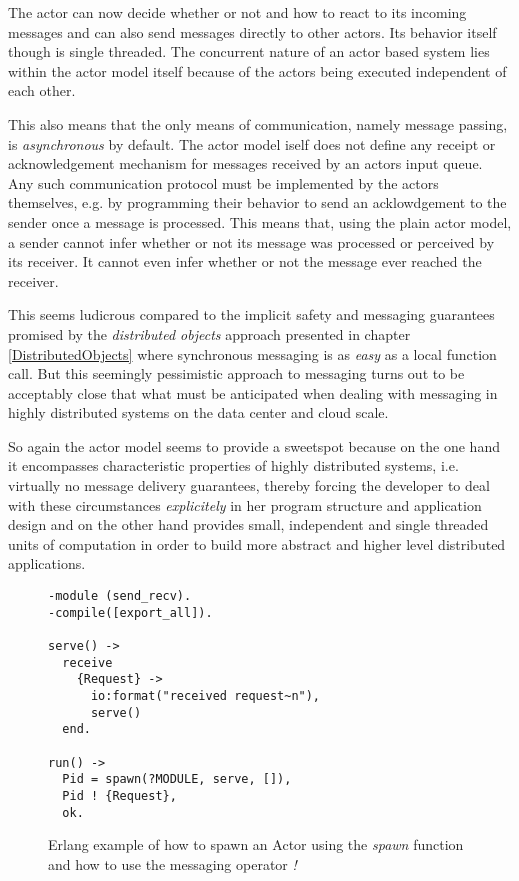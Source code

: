 The actor can now decide whether or not and how to react to
its incoming messages and can also send messages directly to other
actors. Its behavior itself though is single threaded.
The concurrent nature of an actor based system lies within the
actor model itself because of the actors being executed independent
of each other.

This also means that the only means of communication,
namely message passing, is \textit{asynchronous} by default.
The actor model iself does not define any receipt or acknowledgement mechanism
for messages received by an actors input queue. Any such communication
protocol must be implemented by the actors themselves, e.g. by
programming their behavior to send an acklowdgement to the sender once
a message is processed. This means that, using the plain actor model,
a sender cannot infer whether or not its message was processed
or perceived by its receiver. It cannot even infer whether or not
the message ever reached the receiver.
\newline

This seems ludicrous compared to the implicit safety and messaging
guarantees promised by the \textit{distributed objects} approach
presented in chapter \ref{DistributedObjects} where synchronous
messaging is as \textit{easy} as a local function call. But this
seemingly pessimistic approach to messaging turns out to be
acceptably close that what must be anticipated when dealing with
messaging in highly distributed systems on the data center and cloud
scale.

So again the actor model seems to provide a sweetspot because on
the one hand it encompasses characteristic properties of highly
distributed systems, i.e. virtually no message delivery guarantees,
thereby forcing the developer to deal with these circumstances
\textit{explicitely} in her program structure and application design and on the other
hand provides small, independent and single threaded units of
computation in order to build more abstract and higher level
distributed applications.

\setlength{\intextsep}{10pt}
\setlength{\columnsep}{20pt}

\begin{wrapfigure}{l}{0.5\textwidth}
    \begin{lstlisting}
-module (send_recv).
-compile([export_all]).

serve() ->
  receive
    {Request} ->
      io:format("received request~n"),
      serve()
  end.

run() ->
  Pid = spawn(?MODULE, serve, []),
  Pid ! {Request},
  ok.
    \end{lstlisting}
  \caption{Erlang example of how to spawn an Actor using the \textit{spawn}
          function and how to use the messaging operator \textit{!}}
  \label{erlang-example}
\end{wrapfigure}

